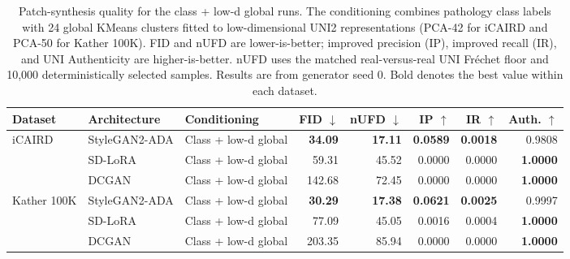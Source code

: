 \begin{table}[htbp]
\centering
\small
\setlength{\tabcolsep}{4pt}
\begin{tabular}{lllrrrrr}
\toprule
Dataset & Architecture & Conditioning & FID $\downarrow$ & nUFD $\downarrow$ & IP $\uparrow$ & IR $\uparrow$ & Auth. $\uparrow$ \\
\midrule
\multirow{3}{*}{iCAIRD} & StyleGAN2-ADA & Class + low-d global & \textbf{34.09} & \textbf{17.11} & \textbf{0.0589} & \textbf{0.0018} & 0.9808 \\
 & SD-LoRA & Class + low-d global & 59.31 & 45.52 & 0.0000 & 0.0000 & \textbf{1.0000} \\
 & DCGAN & Class + low-d global & 142.68 & 72.45 & 0.0000 & 0.0000 & \textbf{1.0000} \\
\midrule
\multirow{3}{*}{Kather 100K} & StyleGAN2-ADA & Class + low-d global & \textbf{30.29} & \textbf{17.38} & \textbf{0.0621} & \textbf{0.0025} & 0.9997 \\
 & SD-LoRA & Class + low-d global & 77.09 & 45.05 & 0.0016 & 0.0004 & \textbf{1.0000} \\
 & DCGAN & Class + low-d global & 203.35 & 85.94 & 0.0000 & 0.0000 & \textbf{1.0000} \\
\bottomrule
\end{tabular}
\caption{Patch-synthesis quality for the class + low-d global runs. The conditioning combines pathology class labels with 24 global KMeans clusters fitted to low-dimensional UNI2 representations (PCA-42 for iCAIRD and PCA-50 for Kather 100K). FID and nUFD are lower-is-better; improved precision (IP), improved recall (IR), and UNI Authenticity are higher-is-better. nUFD uses the matched real-versus-real UNI Fr\'echet floor and 10,000 deterministically selected samples. Results are from generator seed 0. Bold denotes the best value within each dataset.}
\label{tab:low-d-global-quality}
\end{table}

